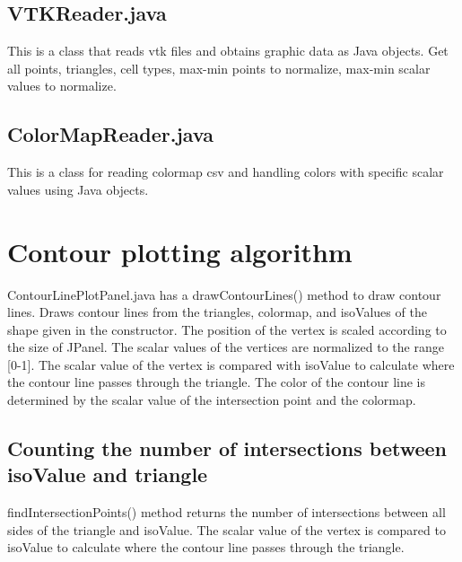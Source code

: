 \documentclass[12pt]{article}
\begin{document}
\subsection{VTKReader.java}
This is a class that reads vtk files and obtains graphic data as Java objects. Get all points, triangles, cell types, max-min points to normalize, max-min scalar values to normalize.
\subsection{ColorMapReader.java}
This is a class for reading colormap csv and handling colors with specific scalar values using Java objects.

\section{Contour plotting algorithm}
ContourLinePlotPanel.java has a drawContourLines() method to draw contour lines. Draws contour lines from the triangles, colormap, and isoValues of the shape given in the constructor. The position of the vertex is scaled according to the size of JPanel. The scalar values of the vertices are normalized to the range [0-1]. The scalar value of the vertex is compared with isoValue to calculate where the contour line passes through the triangle. The color of the contour line is determined by the scalar value of the intersection point and the colormap.
\subsection{Counting the number of intersections between isoValue and triangle}
findIntersectionPoints() method returns the number of intersections between all sides of the triangle and isoValue. The scalar value of the vertex is compared to isoValue to calculate where the contour line passes through the triangle.
\end{document}
